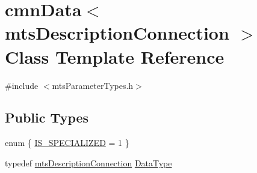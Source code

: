 \hypertarget{classcmn_data_3_01mts_description_connection_01_4}{\section{cmn\-Data$<$ mts\-Description\-Connection $>$ Class Template Reference}
\label{classcmn_data_3_01mts_description_connection_01_4}
}


{\ttfamily \#include $<$mts\-Parameter\-Types.\-h$>$}

\subsection*{Public Types}
\begin{DoxyCompactItemize}
\item 
enum \{ \hyperlink{classcmn_data_3_01mts_description_connection_01_4_aaa0116aa4e31f4127587d4fae40433a5a7b0c948b9ee14c84663770cf2547cbe6}{I\-S\-\_\-\-S\-P\-E\-C\-I\-A\-L\-I\-Z\-E\-D} = 1
 \}
\item 
typedef \hyperlink{classmts_description_connection}{mts\-Description\-Connection} \hyperlink{classcmn_data_3_01mts_description_connection_01_4_ab5515cf136f07ae656b44ade675282a9}{Data\-Type}
\end{DoxyCompactItemize}
